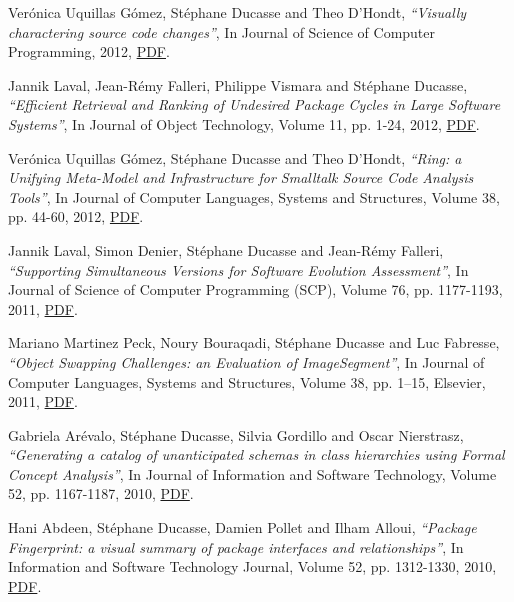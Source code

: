 \documentclass{article}
\newcommand{\czauthors}[1]{#1}
\newcommand{\cztitle}[1]{\emph{``#1''}}
\newcommand{\czjournal}[1]{#1}
\begin{document}
\begin{itemize}
	\pub  \czauthors{Ver\'onica Uquillas G\'omez, St\'ephane Ducasse and Theo D'Hondt},  \cztitle{Visually charactering source code changes},  In \czjournal{Journal of Science of Computer Programming}, 2012, \href{http://rmod-files.lille.inria.fr/Team/Texts/Papers/Uqui13a-SCICO-Official-VisuallyCharacterizingChange.pdf}{PDF}.

	\pub  \czauthors{Jannik Laval, Jean-R\'{e}my Falleri, Philippe Vismara and St\'ephane Ducasse},  \cztitle{Efficient Retrieval and Ranking of Undesired Package Cycles in Large Software Systems},  In \czjournal{Journal of Object Technology}, Volume 11, pp. 1-24, 2012, \href{http://rmod-files.lille.inria.fr/Team/Texts/Papers/Lava12b-JOT-Ranking.pdf}{PDF}.

	\pub  \czauthors{Ver\'onica Uquillas G\'omez, St\'ephane Ducasse and Theo D'Hondt},  \cztitle{Ring: a Unifying Meta-Model and Infrastructure for {S}malltalk Source Code Analysis Tools},  In \czjournal{Journal of Computer Languages, Systems and Structures}, Volume 38, pp. 44-60, 2012, \href{http://rmod-files.lille.inria.fr/Team/Texts/Papers/Uqui11a-RingJournalPaper-CSSJournal.pdf}{PDF}.

	\pub  \czauthors{Jannik Laval, Simon Denier, St\'ephane Ducasse and Jean-R\'emy Falleri},  \cztitle{Supporting Simultaneous Versions for Software Evolution Assessment},  In \czjournal{Journal of Science of Computer Programming (SCP)}, Volume 76, pp. 1177-1193, 2011, \href{http://rmod-files.lille.inria.fr/Team/Texts/Papers/Lava10a-Official-SCP-Orion.pdf}{PDF}.

	\pub  \czauthors{Mariano Martinez Peck, Noury Bouraqadi, St\'ephane Ducasse and Luc Fabresse},  \cztitle{Object Swapping Challenges: an Evaluation of {ImageSegment}},  In \czjournal{Journal of Computer Languages, Systems and Structures}, Volume 38, pp. 1--15, Elsevier, 2011, \href{http://rmod-files.lille.inria.fr/Team/Texts/Papers/Mart11c-COMLAN-ObjectSwapping.pdf}{PDF}.

	\pub  \czauthors{Gabriela Ar\'evalo, St\'ephane Ducasse, Silvia Gordillo and Oscar Nierstrasz},  \cztitle{Generating a catalog of unanticipated schemas in class hierarchies using Formal Concept Analysis},  In \czjournal{Journal of Information and Software Technology}, Volume 52, pp. 1167-1187, 2010, \href{http://rmod-files.lille.inria.fr/Team/Texts/Papers/Arev10a-IST-generatingCatalog.pdf}{PDF}.

	\pub  \czauthors{Hani Abdeen, St\'ephane Ducasse, Damien Pollet and Ilham Alloui},  \cztitle{Package Fingerprint: a visual summary of package interfaces and relationships},  In \czjournal{Information and Software Technology Journal}, Volume 52, pp. 1312-1330, 2010, \href{http://rmod-files.lille.inria.fr/Team/Texts/Papers/Abde10a-IST-Official-packageFingerprints.pdf}{PDF}.


\end{itemize}
\end{document}
